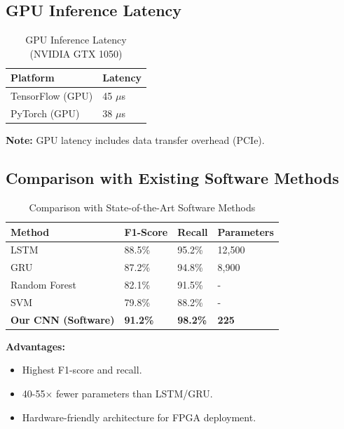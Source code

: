 \documentclass[11pt, a4paper]{article}
\begin{document}
\subsection{GPU Inference Latency}

\begin{table}[H]
\centering
\caption{GPU Inference Latency (NVIDIA GTX 1050)}
\label{tab:gpu_latency}
\begin{tabular}{@{}ll@{}}
\toprule
\textbf{Platform} & \textbf{Latency} \\ \midrule
TensorFlow (GPU) & 45 $\mu$s \\
PyTorch (GPU) & 38 $\mu$s \\ \bottomrule
\end{tabular}
\end{table}

\textbf{Note:} GPU latency includes data transfer overhead (PCIe).

\subsection{Comparison with Existing Software Methods}

\begin{table}[H]
\centering
\caption{Comparison with State-of-the-Art Software Methods}
\label{tab:sota_comparison}
\begin{tabular}{@{}llll@{}}
\toprule
\textbf{Method} & \textbf{F1-Score} & \textbf{Recall} & \textbf{Parameters} \\ \midrule
LSTM \cite{sun2021} & 88.5\% & 95.2\% & 12,500 \\
GRU \cite{liu2020} & 87.2\% & 94.8\% & 8,900 \\
Random Forest \cite{chico2018} & 82.1\% & 91.5\% & - \\
SVM \cite{yang2019} & 79.8\% & 88.2\% & - \\
\textbf{Our CNN (Software)} & \textbf{91.2\%} & \textbf{98.2\%} & \textbf{225} \\ \bottomrule
\end{tabular}
\end{table}

\textbf{Advantages:}
\begin{itemize}
    \item Highest F1-score and recall.
    \item 40-55$\times$ fewer parameters than LSTM/GRU.
    \item Hardware-friendly architecture for FPGA deployment.
\end{itemize}
\end{document}
